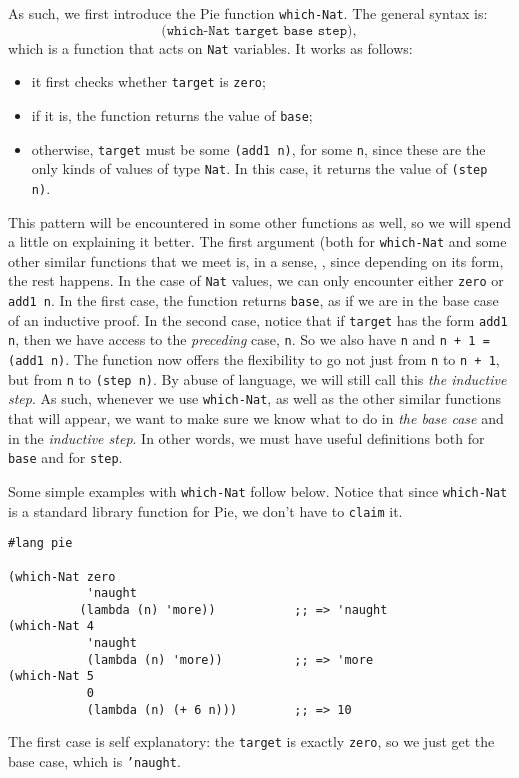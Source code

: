 As such, we first introduce the Pie function \texttt{which-Nat}.
The general syntax is:
\[
  \texttt{(which-Nat \ target \ base \ step)},
\]
which is a function that acts on \texttt{Nat} variables.
It works as follows:
\begin{itemize}
\item it first checks whether \texttt{target} is \texttt{zero};
\item if it is, the function returns the value of \texttt{base};
\item otherwise, \texttt{target} must be some \texttt{(add1 n)},
  for some \texttt{n}, since these are the only kinds of values of type
  \texttt{Nat}. In this case, it returns the value of \texttt{(step n)}.
\end{itemize}

This pattern will be encountered in some other functions as well,
so we will spend a little on explaining it better. The first argument
(both for \texttt{which-Nat} and some other similar functions that we
meet is, in a sense, , since depending on its form,
the rest happens. In the case of \texttt{Nat} values, we can only encounter
either \texttt{zero} or \texttt{add1 n}. In the first case, the function
returns \texttt{base}, as if we are in the base case of an inductive proof.
In the second case, notice that if \texttt{target} has the form
\texttt{add1 n}, then we have access to the \emph{preceding} case, \texttt{n}.
So we also have \texttt{n} and \texttt{n + 1 = (add1 n)}. The function now
offers the flexibility to go not just from \texttt{n} to \texttt{n + 1},
but from \texttt{n} to \texttt{(step n)}. By abuse of language, we will still
call this \emph{the inductive step}. As such, whenever we use \texttt{which-Nat},
as well as the other similar functions that will appear, we want to make
sure we know what to do in \emph{the base case} and in the \emph{inductive step}.
In other words, we must have useful definitions both for \texttt{base}
and for \texttt{step}.

Some simple examples with \texttt{which-Nat} follow below. Notice that since
\texttt{which-Nat} is a standard library function for Pie, we don't have
to \texttt{claim} it.
{
  \small
\begin{verbatim}
#lang pie

(which-Nat zero
           'naught
          (lambda (n) 'more))           ;; => 'naught
(which-Nat 4
           'naught
           (lambda (n) 'more))          ;; => 'more
(which-Nat 5
           0
           (lambda (n) (+ 6 n)))        ;; => 10
\end{verbatim}
}
The first case is self explanatory: the \texttt{target} is exactly
\texttt{zero}, so we just get the base case, which is \texttt{'naught}.

